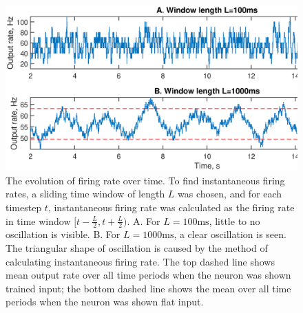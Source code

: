 \documentclass[a4paper,12pt]{report}
\theoremstyle{definition}
\begin{document}
\begin{figure}[!htb]
    \includegraphics[width=\textwidth]{figures/exp6_voltageoscillation.eps}
    \caption{The evolution of firing rate over time. To find instantaneous firing rates, a sliding time window of length $L$ was chosen, and for each timestep $t$, instantaneous firing rate was calculated as the firing rate in time window $[t-\frac{L}{2}, t+\frac{L}{2})$.
    A. For $L=100\mathrm{ms}$, little to no oscillation is visible. B. For $L=1000\mathrm{ms}$, a clear oscillation is seen. The triangular shape of oscillation is caused by the method of calculating instantaneous firing rate. The top dashed line shows mean output rate over all time periods when the neuron was shown trained input; the bottom dashed line shows the mean over all time periods when the neuron was shown flat input.}
    \label{fig:exp6voltageoscillation}
\end{figure}
\end{document}
